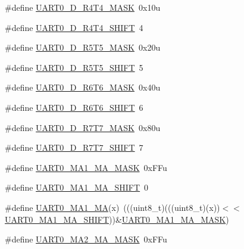 \begin{DoxyCompactItemize}
\item 
\#define \hyperlink{group___u_a_r_t0___register___masks_ga9ef0e5c43310e85c56accdcac2193bd7}{U\+A\+R\+T0\+\_\+\+D\+\_\+\+R4\+T4\+\_\+\+M\+A\+SK}~0x10u
\item 
\#define \hyperlink{group___u_a_r_t0___register___masks_gae0e84ea8d517404064d82a8fac69e39a}{U\+A\+R\+T0\+\_\+\+D\+\_\+\+R4\+T4\+\_\+\+S\+H\+I\+FT}~4
\item 
\#define \hyperlink{group___u_a_r_t0___register___masks_gaaeccc9a4eea797b215e73defa6eb7fbb}{U\+A\+R\+T0\+\_\+\+D\+\_\+\+R5\+T5\+\_\+\+M\+A\+SK}~0x20u
\item 
\#define \hyperlink{group___u_a_r_t0___register___masks_gad5485d0f250bb194d8c7722f76666178}{U\+A\+R\+T0\+\_\+\+D\+\_\+\+R5\+T5\+\_\+\+S\+H\+I\+FT}~5
\item 
\#define \hyperlink{group___u_a_r_t0___register___masks_gad555e177bcea7c90924e5a98be00380c}{U\+A\+R\+T0\+\_\+\+D\+\_\+\+R6\+T6\+\_\+\+M\+A\+SK}~0x40u
\item 
\#define \hyperlink{group___u_a_r_t0___register___masks_ga1083033a9d6894a5c264dac4f7dc67ce}{U\+A\+R\+T0\+\_\+\+D\+\_\+\+R6\+T6\+\_\+\+S\+H\+I\+FT}~6
\item 
\#define \hyperlink{group___u_a_r_t0___register___masks_gab3a6b86f1cf57c7559bd4200509a354b}{U\+A\+R\+T0\+\_\+\+D\+\_\+\+R7\+T7\+\_\+\+M\+A\+SK}~0x80u
\item 
\#define \hyperlink{group___u_a_r_t0___register___masks_gabe35832ee13e5e5b6ab53ad6f357bac2}{U\+A\+R\+T0\+\_\+\+D\+\_\+\+R7\+T7\+\_\+\+S\+H\+I\+FT}~7
\item 
\#define \hyperlink{group___u_a_r_t0___register___masks_ga9eedde4d09d80e7f305d5217aa6b894f}{U\+A\+R\+T0\+\_\+\+M\+A1\+\_\+\+M\+A\+\_\+\+M\+A\+SK}~0x\+F\+Fu
\item 
\#define \hyperlink{group___u_a_r_t0___register___masks_ga97f0146ebe2278bfbb80f350bcb8f238}{U\+A\+R\+T0\+\_\+\+M\+A1\+\_\+\+M\+A\+\_\+\+S\+H\+I\+FT}~0
\item 
\#define \hyperlink{group___u_a_r_t0___register___masks_gad868c0319c33d444b3aac8c88f4132d3}{U\+A\+R\+T0\+\_\+\+M\+A1\+\_\+\+MA}(x)~(((uint8\+\_\+t)(((uint8\+\_\+t)(x))$<$$<$\hyperlink{group___u_a_r_t0___register___masks_ga97f0146ebe2278bfbb80f350bcb8f238}{U\+A\+R\+T0\+\_\+\+M\+A1\+\_\+\+M\+A\+\_\+\+S\+H\+I\+FT}))\&\hyperlink{group___u_a_r_t0___register___masks_ga9eedde4d09d80e7f305d5217aa6b894f}{U\+A\+R\+T0\+\_\+\+M\+A1\+\_\+\+M\+A\+\_\+\+M\+A\+SK})
\item 
\#define \hyperlink{group___u_a_r_t0___register___masks_ga92464fbb6ee7662411228e760fab58d3}{U\+A\+R\+T0\+\_\+\+M\+A2\+\_\+\+M\+A\+\_\+\+M\+A\+SK}~0x\+F\+Fu
$$
\end{DoxyCompactItemize}
